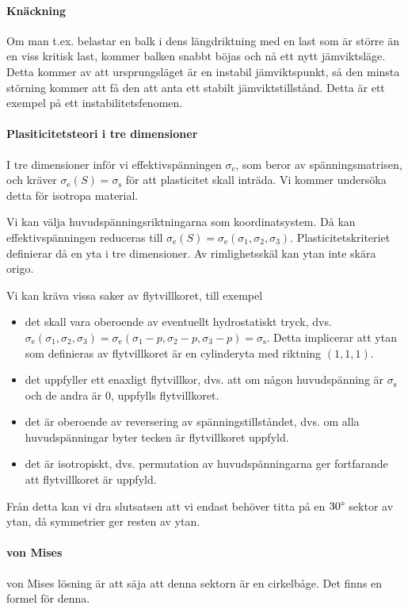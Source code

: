 \paragraph{Knäckning}
Om man t.ex. belastar en balk i dens längdriktning med en last som är större än en viss kritisk last, kommer balken snabbt böjas och nå ett nytt jämviktsläge. Detta kommer av att ursprungsläget är en instabil jämviktspunkt, så den minsta störning kommer att få den att anta ett stabilt jämviktstillstånd. Detta är ett exempel på ett instabilitetsfenomen.

\paragraph{Plasiticitetsteori i tre dimensioner}
I tre dimensioner inför vi effektivspänningen $\sigma_{\text{e}}$, som beror av spänningsmatrisen, och kräver $\sigma_{\text{e}}(S) = \sigma_{\text{s}}$ för att plasticitet skall inträda. Vi kommer undersöka detta för isotropa material.

Vi kan välja huvudspänningsriktningarna som koordinatsystem. Då kan effektivspänningen reduceras till $\sigma_{\text{e}}(S) = \sigma_{\text{e}}(\sigma_{1}, \sigma_{2}, \sigma_{3})$. Plasticitetskriteriet definierar då en yta i tre dimensioner. Av rimlighetsskäl kan ytan inte skära origo.

Vi kan kräva vissa saker av flytvillkoret, till exempel
\begin{itemize}
	\item det skall vara oberoende av eventuellt hydrostatiskt tryck, dvs. $\sigma_{\text{e}}(\sigma_{1}, \sigma_{2}, \sigma_{3}) = \sigma_{\text{e}}(\sigma_{1} - p, \sigma_{2}- p, \sigma_{3}- p) = \sigma_{\text{s}}$. Detta implicerar att ytan som definieras av flytvillkoret är en cylinderyta med riktning $(1, 1, 1)$.
	\item det uppfyller ett enaxligt flytvillkor, dvs. att om någon huvudspänning är $\sigma_{\text{s}}$ och de andra är $0$, uppfylls flytvillkoret.
	\item det är oberoende av reversering av spänningstillståndet, dvs. om alla huvudspänningar byter tecken är flytvillkoret uppfyld.
	\item det är isotropiskt, dvs. permutation av huvudspänningarna ger fortfarande att flytvillkoret är uppfyld.
\end{itemize}
Från detta kan vi dra slutsatsen att vi endast behöver titta på en $30\degree$ sektor av ytan, då symmetrier ger resten av ytan.

\paragraph{von Mises}
von Mises lösning är att säja att denna sektorn är en cirkelbåge. Det finns en formel för denna.

